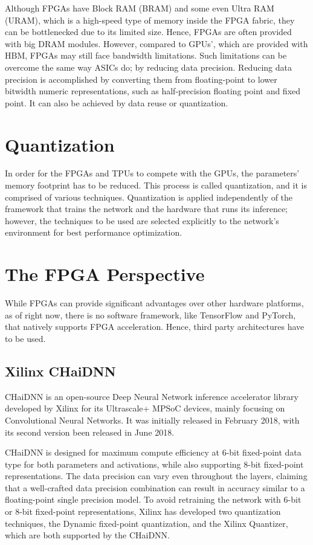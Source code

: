 Although FPGAs have Block RAM (BRAM) and some even Ultra RAM (URAM), which is a high-speed type of memory inside the FPGA fabric, they can be bottlenecked due to its limited size. Hence, FPGAs are often provided with big DRAM modules. However, compared to GPUs', which are provided with HBM, FPGAs may still face bandwidth limitations. Such limitations can be overcome the same way ASICs do; by reducing data precision. Reducing data precision is accomplished by converting them from floating-point to lower bitwidth numeric representations, such as half-precision floating point and fixed point. It can also be achieved by data reuse or quantization.

\section{Quantization}
In order for the FPGAs and TPUs to compete with the GPUs, the parameters' memory footprint has to be reduced. This process is called quantization, and it is comprised of various techniques. Quantization is applied independently of the framework that trains the network and the hardware that runs its inference; however, the techniques to be used are selected explicitly to the network's environment for best performance optimization.

\section{The FPGA Perspective}
While FPGAs can provide significant advantages over other hardware platforms, as of right now, there is no software framework, like TensorFlow and PyTorch, that natively supports FPGA acceleration. Hence, third party architectures have to be used.

\subsection{Xilinx CHaiDNN}
CHaiDNN \cite{CHaiDNN-GitHub} is an open-source Deep Neural Network inference accelerator library developed by Xilinx for its Ultrascale+ MPSoC devices, mainly focusing on Convolutional Neural Networks. It was initially released in February 2018, with its second version been released in June 2018.

CHaiDNN is designed for maximum compute efficiency at 6-bit fixed-point data type for both parameters and activations, while also supporting 8-bit fixed-point representations. The data precision can vary even throughout the layers, claiming that a well-crafted data precision combination can result in accuracy similar to a floating-point single precision model. To avoid retraining the network with 6-bit or 8-bit fixed-point representations, Xilinx has developed two quantization techniques, the Dynamic fixed-point quantization, and the Xilinx Quantizer, which are both supported by the CHaiDNN.

